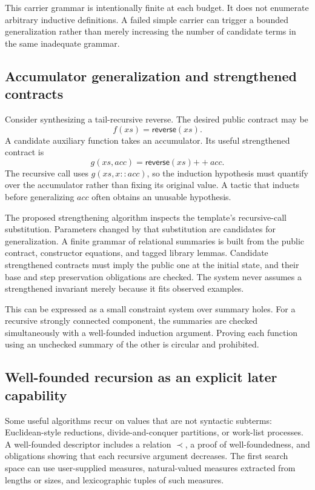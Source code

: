 This carrier grammar is intentionally finite at each budget. It does not enumerate arbitrary inductive definitions. A failed simple carrier can trigger a bounded generalization rather than merely increasing the number of candidate terms in the same inadequate grammar.

\subsection{Accumulator generalization and strengthened contracts}
Consider synthesizing a tail-recursive reverse. The desired public contract may be
\[
  f(xs)=\mathsf{reverse}(xs).
\]
A candidate auxiliary function takes an accumulator. Its useful strengthened contract is
\[
  g(xs,acc)=\mathsf{reverse}(xs)\mathbin{++}acc.
\]
The recursive call uses $g(xs,x::acc)$, so the induction hypothesis must quantify over the accumulator rather than fixing its original value. A tactic that inducts before generalizing $acc$ often obtains an unusable hypothesis.

The proposed strengthening algorithm inspects the template's recursive-call substitution. Parameters changed by that substitution are candidates for generalization. A finite grammar of relational summaries is built from the public contract, constructor equations, and tagged library lemmas. Candidate strengthened contracts must imply the public one at the initial state, and their base and step preservation obligations are checked. The system never assumes a strengthened invariant merely because it fits observed examples.

This can be expressed as a small constraint system over summary holes. For a recursive strongly connected component, the summaries are checked simultaneously with a well-founded induction argument. Proving each function using an unchecked summary of the other is circular and prohibited.

\subsection{Well-founded recursion as an explicit later capability}
Some useful algorithms recur on values that are not syntactic subterms: Euclidean-style reductions, divide-and-conquer partitions, or work-list processes. A well-founded descriptor includes a relation $\prec$, a proof of well-foundedness, and obligations showing that each recursive argument decreases. The first search space can use user-supplied measures, natural-valued measures extracted from lengths or sizes, and lexicographic tuples of such measures.

